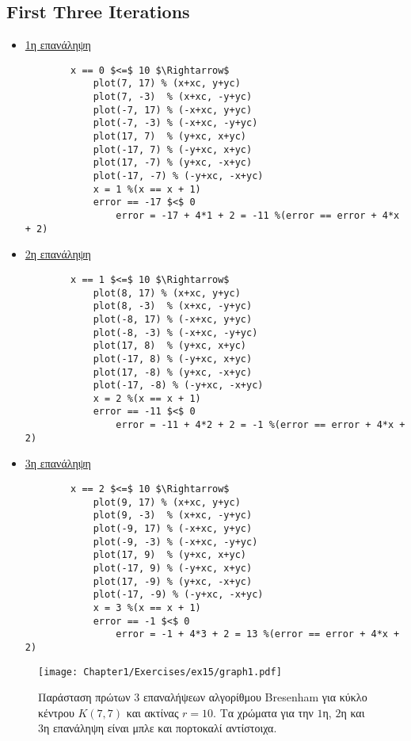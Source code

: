 \begin{solution}
\section*{First Three Iterations}

\begin{itemize}
  \item \underline{1η επανάληψη}
\lstset{style=tt}
		\begin{lstlisting}
		x == 0 $<=$ 10 $\Rightarrow$
			plot(7, 17) % (x+xc, y+yc)
			plot(7, -3)  % (x+xc, -y+yc)
			plot(-7, 17) % (-x+xc, y+yc)
			plot(-7, -3) % (-x+xc, -y+yc)
			plot(17, 7)  % (y+xc, x+yc)
			plot(-17, 7) % (-y+xc, x+yc)
			plot(17, -7) % (y+xc, -x+yc)
			plot(-17, -7) % (-y+xc, -x+yc)
			x = 1 %(x == x + 1)
			error == -17 $<$ 0 
				error = -17 + 4*1 + 2 = -11 %(error == error + 4*x + 2)
		\end{lstlisting}

  \item \underline{2η επανάληψη}

		\begin{lstlisting}
		x == 1 $<=$ 10 $\Rightarrow$
			plot(8, 17) % (x+xc, y+yc)
			plot(8, -3)  % (x+xc, -y+yc)
			plot(-8, 17) % (-x+xc, y+yc)
			plot(-8, -3) % (-x+xc, -y+yc)
			plot(17, 8)  % (y+xc, x+yc)
			plot(-17, 8) % (-y+xc, x+yc)
			plot(17, -8) % (y+xc, -x+yc)
			plot(-17, -8) % (-y+xc, -x+yc)
			x = 2 %(x == x + 1)
			error == -11 $<$ 0 
				error = -11 + 4*2 + 2 = -1 %(error == error + 4*x + 2)
		\end{lstlisting}

  \item \underline{3η επανάληψη}

		\begin{lstlisting}
		x == 2 $<=$ 10 $\Rightarrow$
			plot(9, 17) % (x+xc, y+yc)
			plot(9, -3)  % (x+xc, -y+yc)
			plot(-9, 17) % (-x+xc, y+yc)
			plot(-9, -3) % (-x+xc, -y+yc)
			plot(17, 9)  % (y+xc, x+yc)
			plot(-17, 9) % (-y+xc, x+yc)
			plot(17, -9) % (y+xc, -x+yc)
			plot(-17, -9) % (-y+xc, -x+yc)
			x = 3 %(x == x + 1)
			error == -1 $<$ 0 
				error = -1 + 4*3 + 2 = 13 %(error == error + 4*x + 2)
		\end{lstlisting}
\end{itemize}

\begin{figure}[hbt]
  \begin{center}
	\texttt{[image: Chapter1/Exercises/ex15/graph1.pdf]}
  \end{center}
  \caption{Παράσταση πρώτων $3$ επαναλήψεων αλγορίθμου Bresenham για κύκλο κέντρου $Κ(7,7)$ και ακτίνας $r = 10$. Τα χρώματα για την $1$η, $2$η και $3$η επανάληψη είναι μπλε και πορτοκαλί αντίστοιχα. }
\end{figure}

\end{solution}